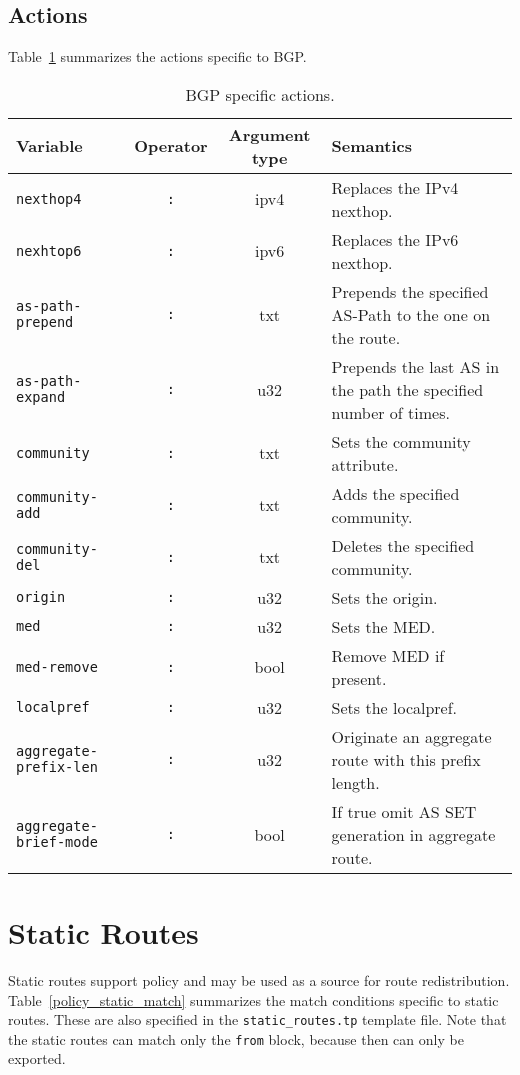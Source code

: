 \subsection{Actions}
Table~\ref{policy_bgp_action} summarizes the actions specific to BGP.
\begin{table}[h]
\centering
\begin{tabular}{|l|c|c|p{7cm}|}
\hline
Variable & Operator & Argument type & Semantics \\
\hline\hline
{\tt nexthop4} & {\tt :} & ipv4 & Replaces the IPv4 nexthop. \\
{\tt nexhtop6} & {\tt :} & ipv6 & Replaces the IPv6 nexthop. \\
\hline
{\tt as-path-prepend} & {\tt :} & txt & Prepends the specified AS-Path to the
one on the route. \\
{\tt as-path-expand} & {\tt :} & u32 & Prepends the last AS in the path the
specified number of times. \\
\hline
{\tt community} & {\tt :} & txt &  Sets the community attribute.\\
{\tt community-add} & {\tt :} & txt & Adds the specified community. \\
\hline
{\tt community-del} & {\tt :} & txt & Deletes the specified community. \\
\hline
{\tt origin} & {\tt :} & u32 & Sets the origin. \\
\hline
{\tt med} & {\tt :} & u32 & Sets the MED. \\
\hline
{\tt med-remove} & {\tt :} & bool & Remove MED if present. \\
\hline
{\tt localpref} & {\tt :} & u32 & Sets the localpref. \\
\hline
{\tt aggregate-prefix-len} & {\tt :} & u32 & Originate an aggregate route with
this prefix length. \\
\hline
{\tt aggregate-brief-mode} & {\tt :} & bool & If true omit AS SET generation
in aggregate route. \\
\hline
\end{tabular}
\caption{\label{policy_bgp_action}BGP specific actions.}
\end{table}

\section{Static Routes}
Static routes support policy and may be used as a source for route
redistribution.
Table~\ref{policy_static_match} summarizes the match conditions specific to
static routes.
These are also specified in the {\tt static\_routes.tp} template file.
Note that the static routes can match only the {\tt from}
block, because then can only be exported.

